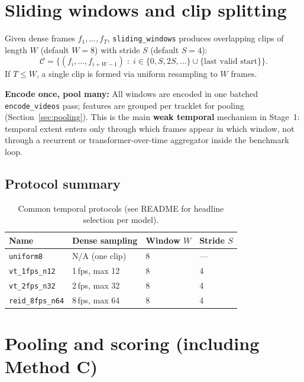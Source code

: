 \documentclass[11pt,a4paper]{article}
\begin{document}
\section{Sliding windows and clip splitting}

\label{sec:windows}

Given dense frames $f_1,\ldots,f_T$, \texttt{sliding\_windows} produces overlapping clips of length $W$ (default $W{=}8$) with stride $S$ (default $S{=}4$):
\[
\mathcal{C} = \bigl\{ (f_i,\ldots,f_{i+W-1}) \;:\; i \in \{0,S,2S,\ldots\} \cup \{\text{last valid start}\} \bigr\}.
\]
If $T \le W$, a single clip is formed via uniform resampling to $W$ frames.

\textbf{Encode once, pool many:} All windows are encoded in one batched \texttt{encode\_videos} pass; features are grouped per tracklet for pooling (Section~\ref{sec:pooling}).
This is the main \textbf{weak temporal} mechanism in Stage~1: temporal extent enters only through which frames appear in which window, not through a recurrent or transformer-over-time aggregator inside the benchmark loop.

\subsection{Protocol summary}
\begin{table}[ht]
\centering
\caption{Common temporal protocols (see README for headline selection per model).}
\begin{tabular}{@{}llll@{}}
\toprule
Name & Dense sampling & Window $W$ & Stride $S$ \\
\midrule
\texttt{uniform8} & N/A (one clip) & 8 & --- \\
\texttt{vt\_1fps\_n12} & 1\,fps, max 12 & 8 & 4 \\
\texttt{vt\_2fps\_n32} & 2\,fps, max 32 & 8 & 4 \\
\texttt{reid\_8fps\_n64} & 8\,fps, max 64 & 8 & 4 \\
\bottomrule
\end{tabular}
\end{table}

\section{Pooling and scoring (including Method C)}
\end{document}
